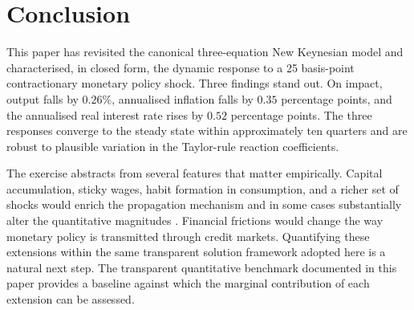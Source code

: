 \section{Conclusion}
\label{sec:conclusion}

This paper has revisited the canonical three-equation New Keynesian
model and characterised, in closed form, the dynamic response to a 25
basis-point contractionary monetary policy shock. Three findings stand
out. On impact, output falls by $0.26\%$, annualised inflation falls by
$0.35$ percentage points, and the annualised real interest rate rises
by $0.52$ percentage points. The three responses converge to the
steady state within approximately ten quarters and are robust to
plausible variation in the Taylor-rule reaction coefficients.

The exercise abstracts from several features that matter empirically.
Capital accumulation, sticky wages, habit formation in consumption,
and a richer set of shocks would enrich the propagation mechanism and
in some cases substantially alter the quantitative magnitudes
\citep[cf.][]{SmetsWouters2007}. Financial frictions would change the
way monetary policy is transmitted through credit markets. Quantifying
these extensions within the same transparent solution framework
adopted here is a natural next step. The transparent quantitative
benchmark documented in this paper provides a baseline against which
the marginal contribution of each extension can be assessed.
